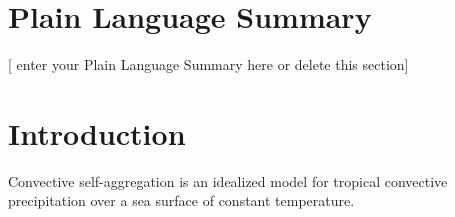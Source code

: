 \documentclass[draft]{agujournal2019}
\begin{document}
\section*{Plain Language Summary}
[ enter your Plain Language Summary here or delete this section]


%
%

%


%
%
%
%


\section{Introduction}\label{sec:intro}
Convective self-aggregation is an idealized model for tropical convective precipitation over a sea surface of constant temperature.
\end{document}
